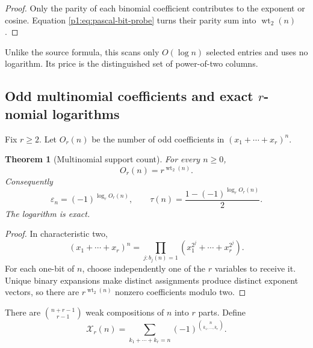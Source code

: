 \documentclass[11pt,oneside]{article}
\numberwithin{equation}{section}
\newtheorem{theorem}{Theorem}[section]
\theoremstyle{definition}
\theoremstyle{remark}
\newcommand{\wt}{\operatorname{wt}_2}
\newcommand{\eps}{\varepsilon}
\begin{document}
\begin{proof}
Only the parity of each binomial coefficient contributes to the exponent or
cosine.  Equation \eqref{p1:eq:pascal-bit-probe} turns their parity sum into
\(\wt(n)\).
\end{proof}

Unlike the source formula, this scans only \(O(\log n)\) selected entries and
uses no logarithm.  Its price is the distinguished set of power-of-two
columns.

\subsection{Odd multinomial coefficients and exact \texorpdfstring{\(r\)}{r}-nomial logarithms}

Fix \(r\ge2\).  Let \(O_r(n)\) be the number of odd coefficients in
\((x_1+\cdots+x_r)^n\).

\begin{theorem}[Multinomial support count]
\label{p1:thm:multinomial-support}
For every \(n\ge0\),
\begin{equation}
  \boxed{O_r(n)=r^{\wt(n)}.}
  \label{p1:eq:multinomial-support}
\end{equation}
Consequently
\begin{equation}
  \boxed{
  \eps_n=(-1)^{\log_rO_r(n)},
  \qquad
  \tau(n)=\frac{1-(-1)^{\log_rO_r(n)}}2.}
  \label{p1:eq:multinomial-log}
\end{equation}
The logarithm is exact.
\end{theorem}

\begin{proof}
In characteristic two,
\begin{equation}
 (x_1+\cdots+x_r)^n
 =\prod_{j:b_j(n)=1}
   (x_1^{2^j}+\cdots+x_r^{2^j}).
  \label{p1:eq:multinomial-frobenius}
\end{equation}
For each one-bit of \(n\), choose independently one of the \(r\) variables to
receive it.  Unique binary expansions make distinct assignments produce
distinct exponent vectors, so there are \(r^{\wt(n)}\) nonzero coefficients
modulo two.
\end{proof}

There are \(\binom{n+r-1}{r-1}\) weak compositions of \(n\) into \(r\) parts.
Define
\begin{equation}
  \mathcal X_r(n)=
  \sum_{k_1+\cdots+k_r=n}
  (-1)^{\binom{n}{k_1,\ldots,k_r}}.
  \label{p1:eq:Xr-definition}
\end{equation}
\end{document}
